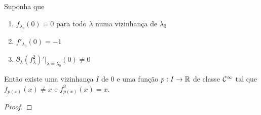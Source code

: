 \begin{theorem}
Suponha que
\begin{enumerate}
\item $f_{\lambda_0}(0) = 0$ para todo $\lambda$ numa vizinhança de $\lambda_0$
\item $f'_{\lambda_0}(0) = -1$
\item $\partial_\lambda (f^2_\lambda)' |_{\lambda = \lambda_0}(0) \neq 0$
\end{enumerate}
Então existe uma vizinhança $I$ de $0$ e uma função $p: I \to \mathbb{R}$ de classe $\mathcal{C}^\infty$ tal que $f_{p(x)}(x) \neq x$ e  $f^2_{p(x)}(x) = x$.
\end{theorem}

\begin{proof}

\end{proof}